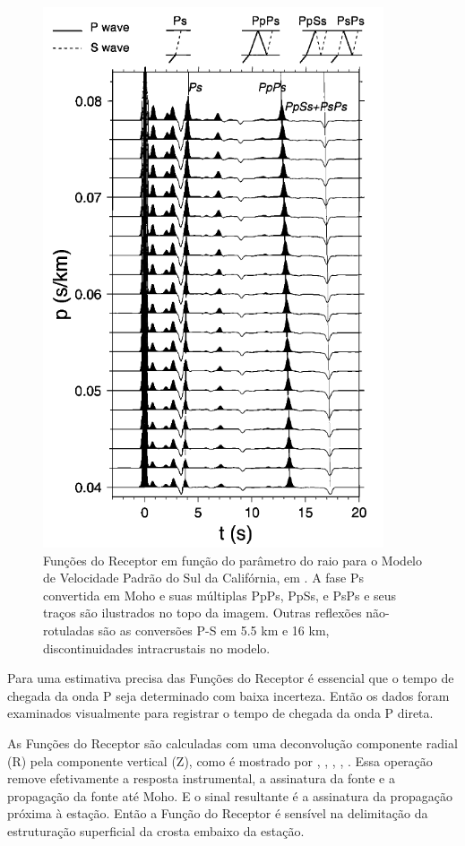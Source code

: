 \begin{figure}[!ht]
\centering
\includegraphics[scale=0.8]{Figs/funcoes_sinteticas.png}
\caption[Funções do Receptor em função do parâmetro do raio para o Modelo de Velocidade Padrão do Sul da Califórnia.]{Funções do Receptor em função do parâmetro do raio para o Modelo de Velocidade Padrão do Sul da Califórnia, em \cite{Zhu_Kanamori_2000}. A fase Ps convertida em Moho e suas múltiplas  PpPs, PpSs, e PsPs e seus traços são ilustrados no topo da imagem. Outras reflexões não-rotuladas são as conversões P-S em 5.5 km e 16 km, discontinuidades intracrustais no modelo.}
\label{funcoes_sinteticas}
\end{figure}

Para uma estimativa precisa das Funções do Receptor é essencial que o tempo de chegada da onda P seja determinado com baixa incerteza. Então os dados foram examinados visualmente para registrar o tempo de chegada da onda P direta. 

As Funções do Receptor são calculadas com uma deconvolução componente radial (R) pela componente vertical (Z), como é mostrado por \cite{clayton_source_1976}, \cite{Langston_1977}, \cite{ammon_isolation_1991}, \cite{cassidy_numerical_1992}, \cite{Zhu_Kanamori_2000}. Essa operação remove efetivamente a resposta instrumental, a assinatura da fonte e a propagação da fonte até Moho. E o sinal resultante é a assinatura da propagação próxima à estação. Então a Função do Receptor é sensível na delimitação da estruturação superficial da crosta embaixo da estação.


